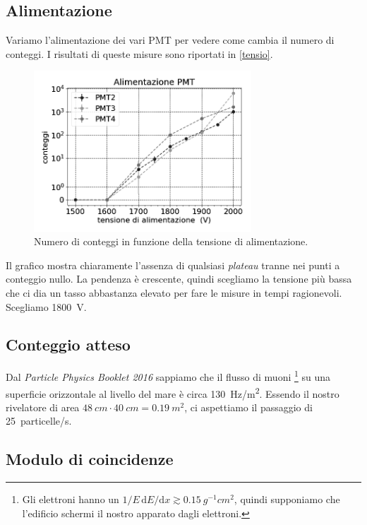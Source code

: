\documentclass[a4paper]{article}
\newcommand*\de{\mathrm{d}}
\begin{document}
\subsection*{Alimentazione}

Variamo l'alimentazione dei vari PMT per vedere come cambia il numero di conteggi. I risultati di queste misure sono  riportati in \autoref{tensio}. 

\begin{figure}[h]
\centering
\includegraphics[width=22em]{tensio_pmt}
\caption{Numero di conteggi in funzione della tensione di alimentazione.}
\label{tensio}
\end{figure}

Il grafico mostra chiaramente l'assenza di qualsiasi \emph{plateau} tranne nei punti a conteggio nullo.
La pendenza è crescente, quindi scegliamo la tensione più bassa che ci dia un tasso abbastanza elevato
per fare le misure in tempi ragionevoli.
Scegliamo \SI{1800}V.

\subsection*{Conteggio atteso}

Dal \emph{Particle Physics Booklet 2016} sappiamo che il flusso di muoni%
\footnote{Gli elettroni hanno un $1/E\, \de E/\de x \gtrsim \SI{0.15}{g^{-1}cm^{2}}$, quindi supponiamo che l'edificio schermi il nostro apparato dagli elettroni.}
 su una superficie orizzontale al livello del mare è circa \SI{130}{Hz/m^2}.
Essendo il nostro rivelatore di area $\SI{48}{cm}\cdot\SI{40}{cm}=\SI{0.19}{m^2}$,
ci aspettiamo il passaggio di \SI{25}{particelle/s}.

\subsection*{Modulo di coincidenze}
\end{document}
